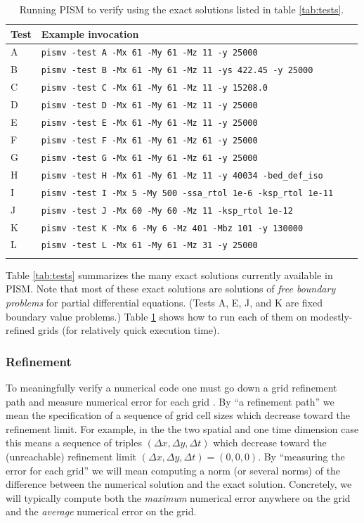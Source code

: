 \documentclass[11pt,final]{amsart}
\begin{document}
\begin{table}[ht]
\caption{Running PISM  to verify using the exact solutions listed in table \ref{tab:tests}.}\label{tab:tests_exec}
\small
\begin{tabular}{@{}llll}\hline
\textbf{Test} & \textbf{Example invocation}  \\ \hline
A & \verb|pismv -test A -Mx 61 -My 61 -Mz 11 -y 25000| \\
B & \verb|pismv -test B -Mx 61 -My 61 -Mz 11 -ys 422.45 -y 25000|  \\
C & \verb|pismv -test C -Mx 61 -My 61 -Mz 11 -y 15208.0|  \\
D & \verb|pismv -test D -Mx 61 -My 61 -Mz 11 -y 25000|  \\
E & \verb|pismv -test E -Mx 61 -My 61 -Mz 11 -y 25000|  \\
F & \verb|pismv -test F -Mx 61 -My 61 -Mz 61 -y 25000|  \\
G & \verb|pismv -test G -Mx 61 -My 61 -Mz 61 -y 25000|  \\
H & \verb|pismv -test H -Mx 61 -My 61 -Mz 11 -y 40034 -bed_def_iso| \\
I & \verb|pismv -test I -Mx 5 -My 500 -ssa_rtol 1e-6 -ksp_rtol 1e-11| \\
J & \verb|pismv -test J -Mx 60 -My 60 -Mz 11 -ksp_rtol 1e-12| \\
K & \verb|pismv -test K -Mx 6 -My 6 -Mz 401 -Mbz 101 -y 130000| \\
L & \verb|pismv -test L -Mx 61 -My 61 -Mz 31 -y 25000| \\
\hline
\normalsize
\end{tabular}
\end{table}

Table \ref{tab:tests} summarizes the many exact solutions currently available in PISM.  Note that most of these exact solutions are solutions of \emph{free boundary problems} for partial differential equations.  (Tests A, E, J, and K are fixed boundary value problems.)  Table \ref{tab:tests_exec} shows how to run each of them on modestly-refined grids (for relatively quick execution time).

\subsubsection*{Refinement}  To meaningfully verify a numerical code one must go down a grid refinement path and measure numerical error for each grid \cite{Roache}.  By ``a refinement path'' we mean the specification of a sequence of grid cell sizes which decrease toward the refinement limit.  For example, in the the two spatial and one time dimension case this means a sequence of triples $(\Delta x,\Delta y,\Delta t)$ which decrease toward the (unreachable) refinement limit $(\Delta x,\Delta y,\Delta t) = (0,0,0)$.  By ``measuring the error for each grid'' we will mean computing a norm (or several norms) of the difference between the numerical solution and the exact solution.   Concretely, we will typically compute both the \emph{maximum} numerical error anywhere on the grid and the \emph{average} numerical error on the grid.
\end{document}
